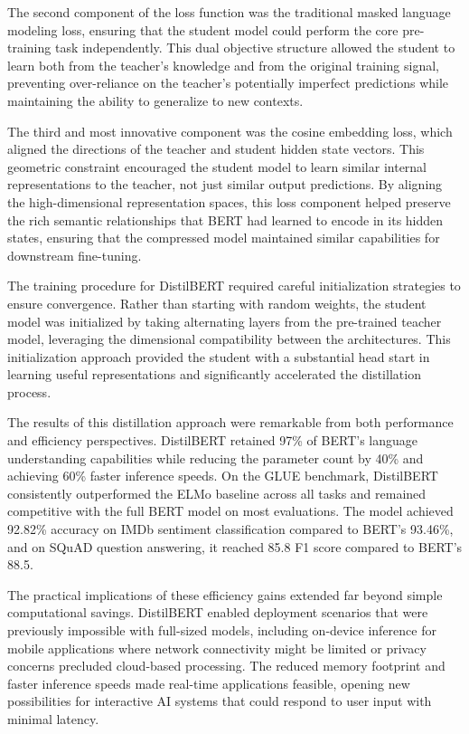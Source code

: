 \documentclass[
  titlepage]{article}
\begin{document}
The second component of the loss function was the traditional masked
language modeling loss, ensuring that the student model could perform
the core pre-training task independently. This dual objective structure
allowed the student to learn both from the teacher's knowledge and from
the original training signal, preventing over-reliance on the teacher's
potentially imperfect predictions while maintaining the ability to
generalize to new contexts.

The third and most innovative component was the cosine embedding loss,
which aligned the directions of the teacher and student hidden state
vectors. This geometric constraint encouraged the student model to learn
similar internal representations to the teacher, not just similar output
predictions. By aligning the high-dimensional representation spaces,
this loss component helped preserve the rich semantic relationships that
BERT had learned to encode in its hidden states, ensuring that the
compressed model maintained similar capabilities for downstream
fine-tuning.

The training procedure for DistilBERT required careful initialization
strategies to ensure convergence. Rather than starting with random
weights, the student model was initialized by taking alternating layers
from the pre-trained teacher model, leveraging the dimensional
compatibility between the architectures. This initialization approach
provided the student with a substantial head start in learning useful
representations and significantly accelerated the distillation process.

The results of this distillation approach were remarkable from both
performance and efficiency perspectives. DistilBERT retained 97\% of
BERT's language understanding capabilities while reducing the parameter
count by 40\% and achieving 60\% faster inference speeds. On the GLUE
benchmark, DistilBERT consistently outperformed the ELMo baseline across
all tasks and remained competitive with the full BERT model on most
evaluations. The model achieved 92.82\% accuracy on IMDb sentiment
classification compared to BERT's 93.46\%, and on SQuAD question
answering, it reached 85.8 F1 score compared to BERT's 88.5.

The practical implications of these efficiency gains extended far beyond
simple computational savings. DistilBERT enabled deployment scenarios
that were previously impossible with full-sized models, including
on-device inference for mobile applications where network connectivity
might be limited or privacy concerns precluded cloud-based processing.
The reduced memory footprint and faster inference speeds made real-time
applications feasible, opening new possibilities for interactive AI
systems that could respond to user input with minimal latency.
\end{document}

